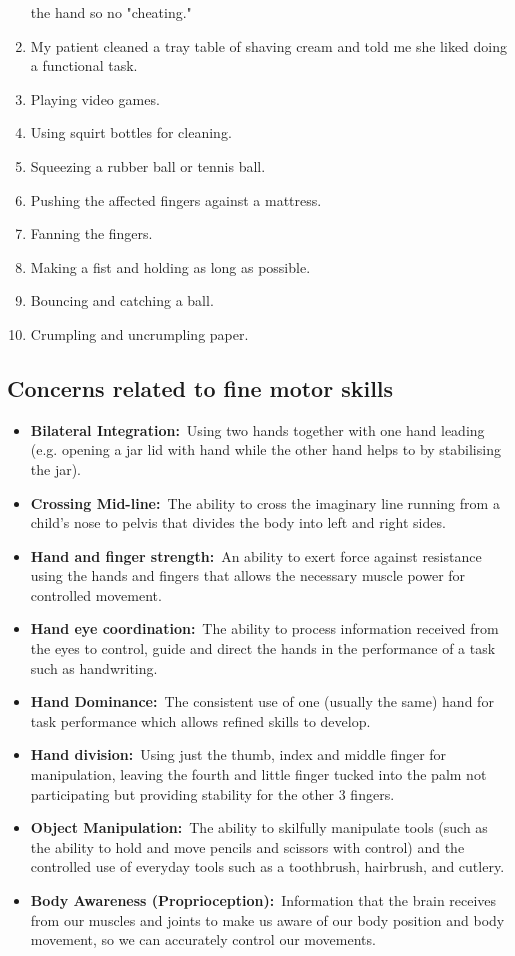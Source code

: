 \begin{enumerate}
the hand so no "cheating."
\item  My patient cleaned a tray table of shaving cream and told me she
liked doing a functional task.
\item  Playing video games.
\item  Using squirt bottles for cleaning.
\item  Squeezing a rubber ball or tennis ball.
\item  Pushing the affected fingers against a mattress.
\item  Fanning the fingers.
\item  Making a fist and holding as long as possible.
\item  Bouncing and catching a ball.
\item Crumpling and uncrumpling paper.

\end{enumerate}

\subsection{Concerns related to fine motor skills}

\begin{itemize}
\item
  \textbf{Bilateral Integration:}~Using two hands together with one hand
  leading (e.g. opening a jar lid with hand while the other hand helps
  to by stabilising the jar).
\item
  \textbf{Crossing Mid-line:}~The ability to cross the imaginary line
  running from a child's nose to pelvis that divides the body into left
  and right sides.
\item
  \textbf{Hand and finger strength:}~An ability to exert force against
  resistance using the hands and fingers that allows the necessary
  muscle power for controlled movement.
\item
  \textbf{Hand eye coordination:}~The ability to process information
  received from the eyes to control, guide and direct the hands in the
  performance of a task such as handwriting.
\item
  \textbf{Hand Dominance:}~The consistent use of one (usually the same)
  hand for task performance which allows refined skills to develop.
\item
  \textbf{Hand division:}~Using just the thumb, index and middle finger
  for manipulation, leaving the fourth and little finger tucked into the
  palm not participating but providing stability for the other 3
  fingers.
\item
  \textbf{Object Manipulation:}~The ability to skilfully manipulate
  tools (such as the ability to hold and move pencils and scissors with
  control) and the controlled use of everyday tools such as a
  toothbrush, hairbrush, and cutlery.
\item
  \textbf{Body Awareness (Proprioception):}~Information that the brain
  receives from our muscles and joints to make us aware of our body
  position and body movement, so we can accurately control our
  movements.
\end{itemize}

